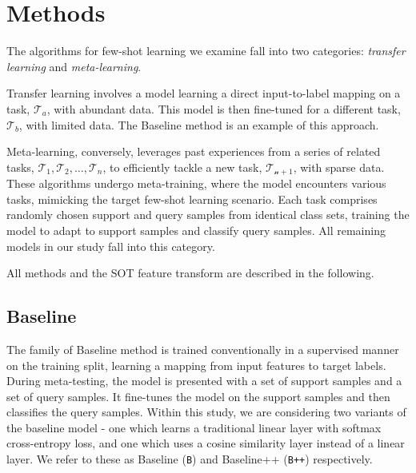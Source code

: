 \section{Methods}

The algorithms for few-shot learning we examine fall into two categories: \textit{transfer learning} and \textit{meta-learning}.

Transfer learning involves a model learning a direct input-to-label mapping on a task, \(\mathcal{T}_a\), with abundant data. This model is then fine-tuned for a different task, \(\mathcal{T}_b\), with limited data. The Baseline method is an example of this approach.

Meta-learning, conversely, leverages past experiences from a series of related tasks, \(\mathcal{T}_1, \mathcal{T}_2, \dots, \mathcal{T}_n\), to efficiently tackle a new task, \(\mathcal{T_{n+1}}\), with sparse data. These algorithms undergo meta-training, where the model encounters various tasks, mimicking the target few-shot learning scenario. Each task comprises randomly chosen support and query samples from identical class sets, training the model to adapt to support samples and classify query samples. All remaining models in our study fall into this category.

All methods and the SOT feature transform are described in the following.


\subsection{Baseline}

The family of Baseline method is trained conventionally in a supervised manner on the training split, learning a mapping from input features to target labels. During meta-testing, the model is presented with a set of support samples and a set of query samples. It fine-tunes the model on the support samples and then classifies the query samples. Within this study, we are considering two variants of the baseline model - one which learns a traditional linear layer with softmax cross-entropy loss, and one which uses a cosine similarity layer instead of a linear layer. We refer to these as Baseline (\texttt{B}) and Baseline++ (\texttt{B++}) respectively.

